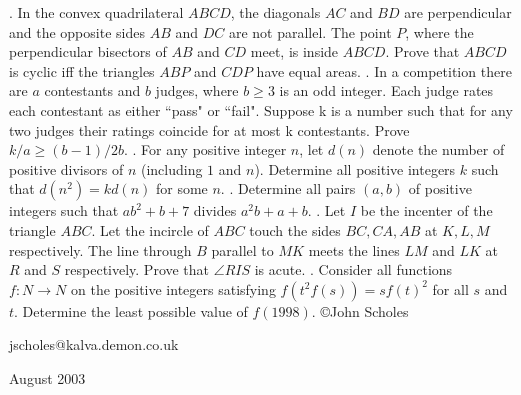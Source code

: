 \nopagenumbers
{}
\vskip 25pt
. In the convex quadrilateral $ABCD$, the diagonals $AC$ and $BD$ are perpendicular and the opposite sides $AB$ and $DC$ are not parallel. The point $P$, where the perpendicular bisectors of $AB$ and $CD$ meet, is inside $ABCD$. Prove that $ABCD$ is cyclic iff the triangles $ABP$ and $CDP$ have equal areas.
\vskip 12pt
. In a competition there are $a$ contestants and $b$ judges, where $b \ge 3$ is an odd integer. Each judge rates each contestant as either ``pass" or ``fail". Suppose k is a number such that for any two judges their ratings coincide for at most k contestants. Prove $k/a \ge (b-1)/2b$.
\vskip 12pt
.  For any positive integer $n$, let $d(n)$ denote the number of positive divisors of $n$ (including $1$ and $n$). Determine all positive integers $k$ such that $d(n^2) = k d(n)$ for some $n$.
\vskip 12pt
. Determine all pairs $(a, b)$ of positive integers such that $ab^2 + b + 7$ divides $a^2b+a+b$.
\vskip 12pt
. Let $I$ be the incenter of the triangle $ABC$. Let the incircle of $ABC$ touch the sides $BC, CA, AB$ at $K, L, M$ respectively. The line through $B$ parallel to $MK$ meets the lines $LM$ and $LK$ at $R$ and $S$ respectively. Prove that $\angle RIS$ is acute.
\vskip 12pt
. Consider all functions $f: N \to N$ on the positive integers satisfying $f(t^2f(s)) = sf(t)^2$ for all $s$ and $t$. Determine the least possible value of $f(1998)$.
\vskip 20pt
\noindent \copyright John Scholes

\noindent jscholes@kalva.demon.co.uk

 August 2003

\bye
